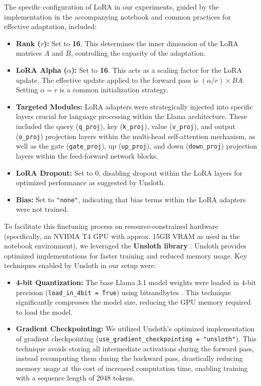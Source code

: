 \documentclass[twocolumn, 11pt,letterpaper]{article}
\begin{document}
The specific configuration of LoRA in our experiments, guided by the implementation in the accompanying notebook and common practices for effective adaptation, included:
\begin{itemize}
    \item \textbf{Rank ($r$):} Set to \textbf{16}. This determines the inner dimension of the LoRA matrices $A$ and $B$, controlling the capacity of the adaptation.
    \item \textbf{LoRA Alpha ($\alpha$):} Set to \textbf{16}. This acts as a scaling factor for the LoRA update. The effective update applied to the forward pass is $(\alpha / r) \times BA$. Setting $\alpha = r$ is a common initialization strategy.
    \item \textbf{Targeted Modules:} LoRA adapters were strategically injected into specific layers crucial for language processing within the Llama architecture. These included the query (\texttt{q\_proj}), key (\texttt{k\_proj}), value (\texttt{v\_proj}), and output (\texttt{o\_proj}) projection layers within the multi-head self-attention mechanism, as well as the gate (\texttt{gate\_proj}), up (\texttt{up\_proj}), and down (\texttt{down\_proj}) projection layers within the feed-forward network blocks.
    \item \textbf{LoRA Dropout:} Set to 0, disabling dropout within the LoRA layers for optimized performance as suggested by Unsloth.
    \item \textbf{Bias:} Set to \texttt{"none"}, indicating that bias terms within the LoRA adapters were not trained.
\end{itemize}

To facilitate this finetuning process on resource-constrained hardware (specifically, an NVIDIA T4 GPU with approx. 15GB VRAM as used in the notebook environment), we leveraged the \textbf{Unsloth library} \cite{unsloth}. Unsloth provides optimized implementations for faster training and reduced memory usage. Key techniques enabled by Unsloth in our setup were:
\begin{itemize}
    \item \textbf{4-bit Quantization:} The base Llama 3.1 model weights were loaded in 4-bit precision (\texttt{load\_in\_4bit = True}) using bitsandbytes \cite{bitsandbytes}. This technique significantly compresses the model size, reducing the GPU memory required to load the model.
    \item \textbf{Gradient Checkpointing:} We utilized Unsloth's optimized implementation of gradient checkpointing (\texttt{use\_gradient\_checkpointing = "unsloth"}). This technique avoids storing all intermediate activations during the forward pass, instead recomputing them during the backward pass, drastically reducing memory usage at the cost of increased computation time, enabling training with a sequence length of 2048 tokens.
\end{itemize}
\end{document}
